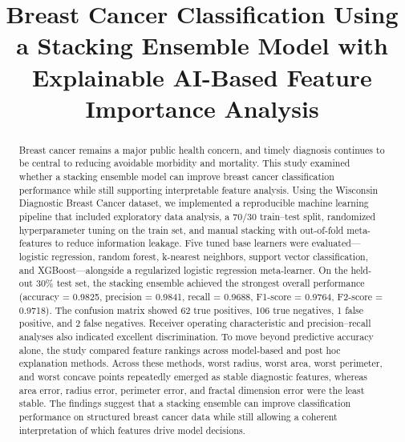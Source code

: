 \documentclass[conference]{IEEEtran}
\begin{document}
\title{Breast Cancer Classification Using a Stacking Ensemble Model with Explainable AI-Based Feature Importance Analysis}

\author{
\and
{}
}

\maketitle

\begin{abstract}
Breast cancer remains a major public health concern, and timely diagnosis continues to be central to reducing avoidable morbidity and mortality. This study examined whether a stacking ensemble model can improve breast cancer classification performance while still supporting interpretable feature analysis. Using the Wisconsin Diagnostic Breast Cancer dataset, we implemented a reproducible machine learning pipeline that included exploratory data analysis, a 70/30 train--test split, randomized hyperparameter tuning on the train set, and manual stacking with out-of-fold meta-features to reduce information leakage. Five tuned base learners were evaluated---logistic regression, random forest, k-nearest neighbors, support vector classification, and XGBoost---alongside a regularized logistic regression meta-learner. On the held-out 30\% test set, the stacking ensemble achieved the strongest overall performance (accuracy = 0.9825, precision = 0.9841, recall = 0.9688, F1-score = 0.9764, F2-score = 0.9718). The confusion matrix showed 62 true positives, 106 true negatives, 1 false positive, and 2 false negatives. Receiver operating characteristic and precision--recall analyses also indicated excellent discrimination. To move beyond predictive accuracy alone, the study compared feature rankings across model-based and post hoc explanation methods. Across these methods, worst radius, worst area, worst perimeter, and worst concave points repeatedly emerged as stable diagnostic features, whereas area error, radius error, perimeter error, and fractal dimension error were the least stable. The findings suggest that a stacking ensemble can improve classification performance on structured breast cancer data while still allowing a coherent interpretation of which features drive model decisions.
\end{abstract}
\end{document}
